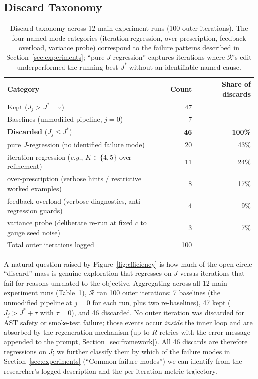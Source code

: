 \documentclass{article}
\begin{document}
\subsection{Discard Taxonomy}
\label{app:discards}
\begin{table}[!h]
\caption{Discard taxonomy across 12 main-experiment runs (100 outer iterations). The four named-mode categories (iteration regression, over-prescription, feedback overload, variance probe) correspond to the failure patterns described in Section~\ref{sec:experiments}; ``pure $J$-regression'' captures iterations where $\mathcal{R}$'s edit underperformed the running best $J^*$ without an identifiable named cause.}
\label{tab:discards}
\centering
\small
\begin{tabular}{@{}lrr@{}}
\toprule
Category & Count & Share of discards \\
\midrule
Kept ($J_j > J^* + \tau$) & 47 & --- \\
Baselines (unmodified pipeline, $j{=}0$) & 7 & --- \\
\midrule
\textbf{Discarded} ($J_j \le J^*$) & \textbf{46} & \textbf{100\%} \\
\quad pure $J$-regression (no identified failure mode) & 20 & 43\% \\
\quad iteration regression (\textit{e.g.}, $K{\in}\{4,5\}$ over-refinement) & 11 & 24\% \\
\quad over-prescription (verbose hints / restrictive worked examples) & 8 & 17\% \\
\quad feedback overload (verbose diagnostics, anti-regression guards) & 4 & 9\% \\
\quad variance probe (deliberate re-run at fixed $c$ to gauge seed noise) & 3 & 7\% \\
\midrule
Total outer iterations logged & 100 & \\
\bottomrule
\end{tabular}
\end{table}

A natural question raised by Figure~\ref{fig:efficiency} is how much of the open-circle ``discard'' mass is genuine exploration that regresses on $J$ versus iterations that fail for reasons unrelated to the objective. Aggregating across all 12 main-experiment runs (Table~\ref{tab:discards}), $\mathcal{R}$ ran 100 outer iterations: 7 baselines (the unmodified pipeline at $j{=}0$ for each run, plus two re-baselines), 47 kept ($J_j > J^* + \tau$ with $\tau{=}0$), and 46 discarded. No outer iteration was discarded for AST safety or smoke-test failure; those events occur \emph{inside} the inner loop and are absorbed by the regeneration mechanism (up to $R$ retries with the error message appended to the prompt, Section~\ref{sec:framework}). All 46 discards are therefore regressions on $J$; we further classify them by which of the failure modes in Section~\ref{sec:experiments} (``Common failure modes'') we can identify from the researcher's logged description and the per-iteration metric trajectory.
\end{document}
